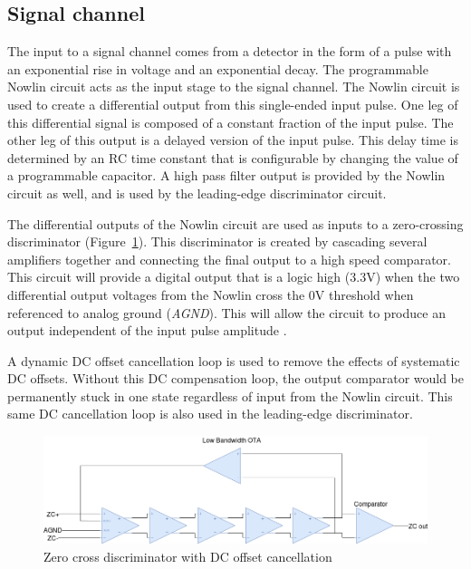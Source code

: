 \documentclass[12pt,oneside,final]{siuethesis}
\theoremstyle{definition}
\begin{document}
\subsection{Signal channel}
\par The input to a signal channel comes from a detector in the form of a pulse with an exponential rise in voltage and an exponential decay. The programmable Nowlin circuit acts as the input stage to the signal channel. The Nowlin circuit is used to create a differential output from this single-ended input pulse. One leg of this differential signal is composed of a constant fraction of the input pulse. The other leg of this output is a delayed version of the input pulse. This delay time is determined by an RC time constant that is configurable by changing the value of a programmable capacitor. A high pass filter output is provided by the Nowlin circuit as well, and is used by the leading-edge discriminator circuit.
\par The differential outputs of the Nowlin circuit are used as inputs to a zero-crossing discriminator (Figure~\ref{fig:zcd}). This discriminator is created by cascading several amplifiers together and connecting the final output to a high speed comparator. This circuit will provide a digital output that is a logic high (3.3V) when the two differential output voltages from the Nowlin cross the 0V threshold when referenced to analog ground (\emph{AGND}). This will allow the circuit to produce an output independent of the input pulse amplitude \cite{CFD}. 
\par A dynamic DC offset cancellation loop is used to remove the effects of systematic DC offsets. Without this DC compensation loop, the output comparator would be permanently stuck in one state regardless of input from the Nowlin circuit. This same DC cancellation loop is also used in the leading-edge discriminator.

\begin{figure}[htbp!]
\centering
\includegraphics[scale=.45,keepaspectratio=true]{./ch2_figures/zcd.png} 
\caption{Zero cross discriminator with DC offset cancellation}
\label{fig:zcd}
\end{figure}
\end{document}
